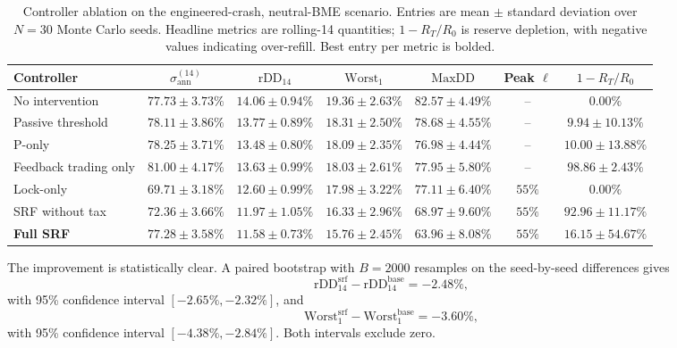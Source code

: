 \documentclass[a4paper,fleqn]{cas-dc}
\begin{document}
\begin{table}[t]
\centering
\caption{Controller ablation on the engineered-crash, neutral-BME scenario. Entries are mean \(\pm\) standard deviation over \(N=30\) Monte Carlo seeds. Headline metrics are rolling-14 quantities; \(1-R_T/R_0\) is reserve depletion, with negative values indicating over-refill. Best entry per metric is bolded.}
\label{tab:abl_results}
\begin{tabular}{|l|c|c|c|c|c|c|}
\hline
\textbf{Controller} & \(\sigma_{\mathrm{ann}}^{(14)}\) & \(\mathrm{rDD}_{14}\) & \(\mathrm{Worst}_1\) & \(\mathrm{MaxDD}\) & Peak \(\ell\) & \(1-R_T/R_0\) \\
\hline
No intervention & \(77.73\!\pm\!3.73\%\) & \(14.06\!\pm\!0.94\%\) & \(19.36\!\pm\!2.63\%\) & \(82.57\!\pm\!4.49\%\) & -- & \(0.00\%\) \\
\hline
Passive threshold & \(78.11\!\pm\!3.86\%\) & \(13.77\!\pm\!0.89\%\) & \(18.31\!\pm\!2.50\%\) & \(78.68\!\pm\!4.55\%\) & -- & \(9.94\!\pm\!10.13\%\) \\
\hline
P-only & \(78.25\!\pm\!3.71\%\) & \(13.48\!\pm\!0.80\%\) & \(18.09\!\pm\!2.35\%\) & \(76.98\!\pm\!4.44\%\) & -- & \(10.00\!\pm\!13.88\%\) \\
\hline
Feedback trading only & \(81.00\!\pm\!4.17\%\) & \(13.63\!\pm\!0.99\%\) & \(18.03\!\pm\!2.61\%\) & \(77.95\!\pm\!5.80\%\) & -- & \(98.86\!\pm\!2.43\%\) \\
\hline
Lock-only & \(\mathbf{69.71\!\pm\!3.18\%}\) & \(12.60\!\pm\!0.99\%\) & \(17.98\!\pm\!3.22\%\) & \(77.11\!\pm\!6.40\%\) & \(55\%\) & \(0.00\%\) \\
\hline
SRF without tax & \(72.36\!\pm\!3.66\%\) & \(11.97\!\pm\!1.05\%\) & \(16.33\!\pm\!2.96\%\) & \(68.97\!\pm\!9.60\%\) & \(55\%\) & \(92.96\!\pm\!11.17\%\) \\
\hline
\textbf{Full SRF} & \(77.28\!\pm\!3.58\%\) & \(\mathbf{11.58\!\pm\!0.73\%}\) & \(\mathbf{15.76\!\pm\!2.45\%}\) & \(\mathbf{63.96\!\pm\!8.08\%}\) & \(55\%\) & \(16.15\!\pm\!54.67\%\) \\
\hline
\end{tabular}
\end{table}

The improvement is statistically clear. A paired bootstrap with \(B=2000\) resamples on the seed-by-seed differences gives
\[
\mathrm{rDD}_{14}^{\mathrm{srf}}
-
\mathrm{rDD}_{14}^{\mathrm{base}}
=
-2.48\%,
\]
with 95\% confidence interval \([-2.65\%,-2.32\%]\), and
\[
\mathrm{Worst}_1^{\mathrm{srf}}
-
\mathrm{Worst}_1^{\mathrm{base}}
=
-3.60\%,
\]
with 95\% confidence interval \([-4.38\%,-2.84\%]\). Both intervals exclude zero.
\end{document}
